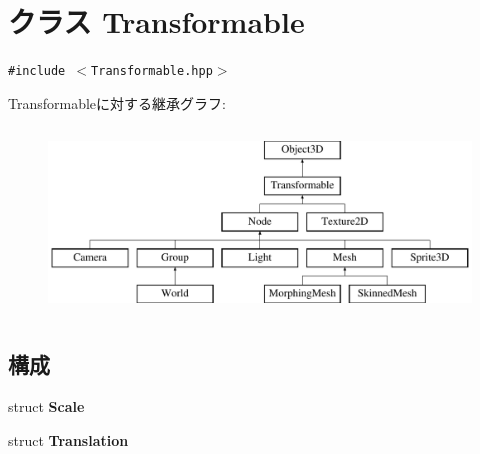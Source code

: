 \hypertarget{classm3g_1_1Transformable}{
\section{クラス Transformable}
\label{classm3g_1_1Transformable}
}
{\tt \#include $<$Transformable.hpp$>$}

Transformableに対する継承グラフ:\begin{figure}[H]
\begin{center}
\leavevmode
\includegraphics[height=5cm]{classm3g_1_1Transformable}
\end{center}
\end{figure}
\subsection*{構成}
\begin{CompactItemize}
\item 
struct \textbf{Scale}
\item 
struct \textbf{Translation}
\end{CompactItemize}
